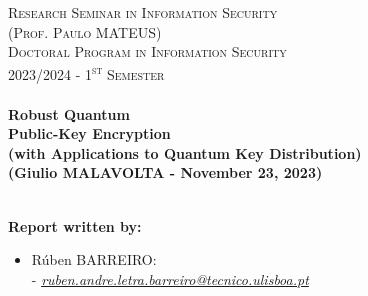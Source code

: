 \documentclass[12pt]{article}
\begin{document}
\begin{titlepage}
\begin{figure}[H]
\begin{minipage}{.5\textwidth}
        \end{minipage}
    \end{figure}
    \vspace{-1cm}
    \textsc{\Large Research Seminar in Information Security}\\[0.5cm] %
    \textsc{(Prof. Paulo \uppercase{Mateus})}\\[0.5cm]
    \textsc{Doctoral Program in Information Security}\\[0.5cm] %
    \textsc{\large 2023/2024 - 1\textsuperscript{st} Semester}\\[0.5cm] %
    
    
    \HRule \\[0.3cm]
        { \huge \bfseries Robust Quantum \\ Public-Key Encryption \\ \large (with Applications to Quantum Key Distribution) \\ \vspace{0.5cm} \Large (Giulio \textsc{\uppercase{Malavolta}} - November 23, 2023)}\\[0.4cm] %
    \HRule \\[1cm]
     
    
    \begin{minipage}{0.75\textwidth}
    
        \begin{flushleft} \large
            \textbf{Report written by:}\\
            \begin{itemize}
                \vspace{-0.1cm}
                \item \normalsize{Rúben \textsc{\uppercase{Barreiro}}:\\
                - \href{mailto:ruben.andre.letra.barreiro@tecnico.ulisboa.pt}{\emph{ruben.andre.letra.barreiro@tecnico.ulisboa.pt}}}
            \end{itemize}
        \end{flushleft}
    

\end{minipage}
\end{titlepage}
\end{document}
